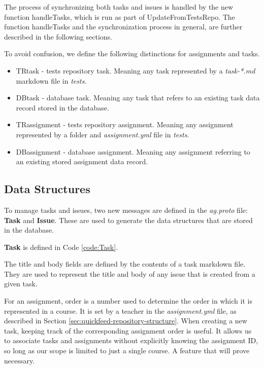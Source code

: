 The process of synchronizing both tasks and issues is handled by the new function handleTasks, which is run as part of UpdateFromTestsRepo.
The function handleTasks and the synchronization process in general, are further described in the following sections. 

To avoid confusion, we define the following distinctions for assignments and tasks.
\begin{itemize}
    \item TRtask - tests repository task. Meaning any task represented by a \textit{task-*.md} markdown file in \textit{tests}.
    \item DBtask - database task. Meaning any task that refers to an existing task data record stored in the database.
    \item TRassignment - tests repository assignment. Meaning any assignment represented by a folder and \textit{assignment.yml} file
    in \textit{tests}. 
    \item DBassignment - database assignment. Meaning any assignment referring to an existing stored assignment data record.
\end{itemize}

\subsection{Data Structures}
\label{sec:tasks-and-issues-data-structures}

To manage tasks and issues, two new messages are defined in the \textit{ag.proto} file: \textbf{Task} and \textbf{Issue}.
These are used to generate the data structures that are stored in the database.

\textbf{Task} is defined in Code \ref{code:Task}.



The title and body fields are defined by the contents of a task markdown file.
They are used to represent the title and body of any issue that is created from a given task.

For an assignment, order is a number used to determine the order in which it is represented in a course.
It is set by a teacher in the \textit{assignment.yml} file, as described in Section \ref{sec:quickfeed-repository-structure}.
When creating a new task, keeping track of the corresponding assignment order is useful.
It allows us to associate tasks and assignments without explicitly knowing the assignment ID, so long as our scope is limited to just a single course.
A feature that will prove necessary.

